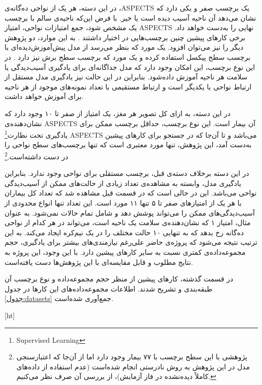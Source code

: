در این دسته، 
هر یک از نواحی ده‌گانه‌ی ،ASPECTS
یک برچسب صفر و یکی دارد که نشان می‌دهد آن ناحیه آسیب دیده است یا خیر.
با فرض این‌که ناحیه‌ی سالم با برچسب یک مشخص شود، جمع امتیازات نواحی، امتیاز ASPECTS نهایی را به‌دست خواهد داد.
برخی کار‌های پیشین
چنین برچسب‌هایی در اختیار داشتند \cite{lee2023clinical,jung2018evaluating,kuang2019automated}.
به این موارد، دو پژوهش دیگر را نیز می‌توان افزود.
یک مورد که بنظر می‌رسد از مدل پیش‌آموزش‌دیده‌ای با برچسب سطح پیکسل استفاده کرده 
\cite{naganuma2021alberta}
و یک مورد که برچسب سطح برش نیز دارد \cite{chiang2022deep}.
در این نوع برچسب، این امکان وجود دارد که مدل جداگانه‌ای برای یادگیری
آسیب‌دیدگی یا سلامت هر ناحیه آموزش داده‌شود.
بنابراین در این حالت نیز یادگیری مدل مستقل از ارتباط نواحی با یکدیگر است و ارتباط مستقیمی با تعداد نمونه‌های موجود از هر ناحیه برای آموزش خواهد داشت.

در این دسته، به ازای کل تصویر هر مغز، 
یک امتیاز از صفر تا ۱۰ وجود دارد که نشان‌دهنده‌ی ASPECTS آن بیمار است.
این نوع برچسب، حداقل برچسب ممکن برای 
یادگیری تحت نظارت\footnote{Supervised Learning} 
ASPECTS می‌باشد و
تا آن‌جا که در جستجو برای کار‌های پیشین به‌دست آمد، این پژوهش، تنها مورد معتبری
است که تنها برچسب‌های سطح نواحی را در دست داشته‌است.\footnote{پژوهشی با این سطح برچسب با ۷۷ بیمار وجود دارد 
\cite{golkonda2022automated}
اما از آن‌جا که اعتبارسنجی مدل در این پژوهش به روش نادرستی انجام شده‌است (عدم استفاده از داده‌های کاملاً دیده‌نشده در فاز آزمایش)، از بررسی آن صرف نظر می‌کنیم.}

در این دسته برخلاف دسته‌ی قبل، برچسب  مستقلی برای نواحی وجود ندارد.
بنابراین 
یادگیری مدل، وابسته به مشاهده‌ی تعداد زیادی از حالت‌های ممکن از آسیب‌دیدگی نواحی می‌باشد.
این در حالی است که در قسمت قبل مشاهده شد که تعداد کل بیماران با هر یک از امتیازهای صفر تا ۵ تنها ۱۱ مورد است.
این تعداد تنها انواع محدودی از آسیب‌دیدگی‌های ممکن را می‌تواند پوشش دهد و شامل تمام حالات نمی‌شود. 
به عنوان مثال، امتیاز ۱ که نشان‌دهنده‌ی سلامت یک ناحیه است، می‌تواند در هر کدام از نواحی ده‌گانه رخ بدهد که به تنهایی ۱۰ حالت مختلف را در یک نیم‌کره ایجاد می‌کند. 
به این ترتیب نتیجه می‌شود که پروژه‌ی حاضر علی‌رغم نیازمندی‌های بیشتر برای یادگیری، حجم مجموعه‌داده‌ی کمتری نسبت به سایر کار‌های پیشین دارد.
با این وجود، این پروژه به نتایج مطلوب و قابل مقایسه‌ای با این پژوهش‌ها دست یافته‌است.

در قسمت گذشته، کارهای پیشین از منظر حجم مجموعه‌داده و نوع برچسب آن طبقه‌بندی و تشریح شدند. اطلاعات مجموعه‌داده‌های این کارها در جدول 
\ref{جدول:datasets}
جمع‌آوری شده‌است.

[ht]

